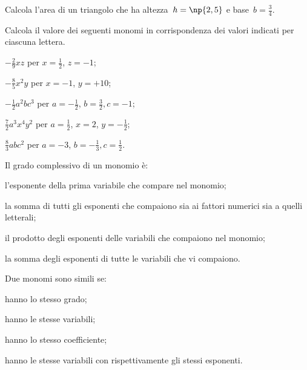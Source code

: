 \begin{esercizio}
\label{ese:10.3} %
Calcola l'area di un triangolo che ha altezza~$h=\np{2,5}$ e base~$b=\frac{3}{4}$.
\end{esercizio}

\begin{esercizio}
 \label{ese:10.4} %
 Calcola il valore dei seguenti monomi in corrispondenza dei valori indicati per ciascuna lettera.

\begin{multicols}{2}
\begin{enumeratea}
 \item $-\frac{2}{9}xz$ per $ x=\frac{1}{2} $, $z=-1$;
 \item $-\frac{8}{5}x^{2}y$ per $ x=-1 $, $y=+10$;
 \item $-\frac{1}{2}a^{2}bc^3$ per $ a=-\frac{1}{2} $, $b=\frac{3}{2},c=-1$;
 \item $\frac{7}{2}a^{3}x^{4}y^2$ per $ a=\frac{1}{2} $, $x=2$, $y=-\frac{1}{2}$;
 \item $\frac{8}{3}abc^2$ per $ a=-3 $, $b=-\frac{1}{3},c=\frac{1}{2}$.
\end{enumeratea}
\end{multicols}
\end{esercizio}


\begin{esercizio}
 \label{ese:10.5} %
 Il grado complessivo di un monomio è:

\begin{enumeratea}
 \item l'esponente della prima variabile che compare nel monomio;
 \item la somma di tutti gli esponenti che compaiono sia ai fattori
numerici sia a quelli letterali;
 \item il prodotto degli esponenti delle variabili che compaiono nel monomio;
 \item la somma degli esponenti di tutte le variabili che vi compaiono.
\end{enumeratea}
\end{esercizio}


\begin{esercizio}
 \label{ese:10.6} %
Due monomi sono simili se:

\begin{enumeratea}
 \item hanno lo stesso grado;
 \item hanno le stesse variabili;
 \item hanno lo stesso coefficiente;
 \item hanno le stesse variabili con rispettivamente gli stessi esponenti.
\end{enumeratea}
\end{esercizio}

